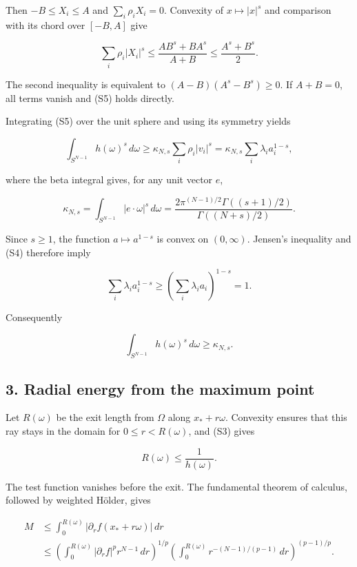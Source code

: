 \documentclass[11pt,a4paper]{article}
\begin{document}
Then \(-B\leq X_i\leq A\) and \(\sum_i\rho_iX_i=0\). Convexity of
\(x\mapsto|x|^s\) and comparison with its chord over \([-B,A]\) give

\[
\sum_i\rho_i|X_i|^s
\leq\frac{AB^s+BA^s}{A+B}
\leq\frac{A^s+B^s}{2}.
\tag{S5}
\]

The second inequality is equivalent to \((A-B)(A^s-B^s)\geq0\). If
\(A+B=0\), all terms vanish and (S5) holds directly.

Integrating (S5) over the unit sphere and using its symmetry yields

\[
\int_{S^{N-1}}h(\omega)^s\,d\omega
\geq\kappa_{N,s}\sum_i\rho_i|v_i|^s
=\kappa_{N,s}\sum_i\lambda_i a_i^{1-s},
\tag{S6}
\]

where the beta integral gives, for any unit vector \(e\),

\[
\kappa_{N,s}
=\int_{S^{N-1}}|e\cdot\omega|^s\,d\omega
=\frac{2\pi^{(N-1)/2}\Gamma((s+1)/2)}
       {\Gamma((N+s)/2)}.
\tag{S7}
\]

Since \(s\geq1\), the function \(a\mapsto a^{1-s}\) is convex on
\((0,\infty)\). Jensen's inequality and (S4) therefore imply

\[
\sum_i\lambda_i a_i^{1-s}
\geq\left(\sum_i\lambda_i a_i\right)^{1-s}=1.
\]

Consequently

\[
\int_{S^{N-1}}h(\omega)^s\,d\omega\geq\kappa_{N,s}.
\tag{S8}
\]

\hypertarget{1016-radial-energy-from-the-maximum-point}{%
\subsection{3. Radial energy from the maximum
point}\label{1016-radial-energy-from-the-maximum-point}}

Let \(R(\omega)\) be the exit length from \(\Omega\) along
\(x_*+r\omega\). Convexity ensures that this ray stays in the domain for
\(0\leq r<R(\omega)\), and (S3) gives

\[
R(\omega)\leq\frac1{h(\omega)}.
\tag{S9}
\]

The test function vanishes before the exit. The fundamental theorem of
calculus, followed by weighted Hölder, gives

\[
\begin{aligned}
M
&\leq\int_0^{R(\omega)}|\partial_r f(x_*+r\omega)|\,dr\\
&\leq
\left(\int_0^{R(\omega)}|\partial_r f|^p r^{N-1}\,dr\right)^{1/p}
\left(\int_0^{R(\omega)}r^{-(N-1)/(p-1)}\,dr\right)^{(p-1)/p}.
\end{aligned}
\]
\end{document}
